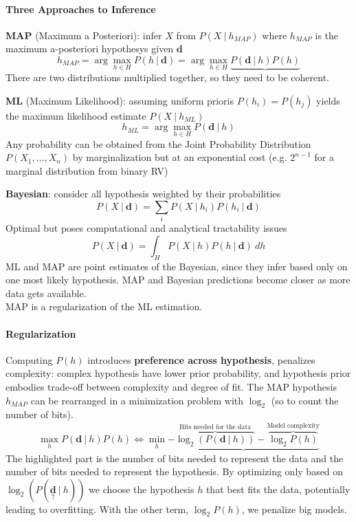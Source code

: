 \documentclass[10pt]{report}
\begin{document}
\paragraph{Three Approaches to Inference}
\begin{list}{}{}
	\item \textbf{MAP} (Maximum a Posteriori): infer $X$ from $P(X\:|\:h_{MAP})$ where $h_{MAP}$ is the maximum a-posteriori hypothesys given $\mathbf{d}$
$$h_{MAP} = \arg\max_{h\in H} P(h\:|\:\mathbf{d}) = \arg\max_{h\in H}\underbrace{ P(\mathbf{d}\:|\:h)P(h)}$$
There are two distributions multiplied together, so they need to be coherent.
	\item \textbf{ML} (Maximum Likelihood): assuming uniform prioris $P(h_i)=P(h_j)$ yields the maximum likelihood estimate $P(X\:|\:h_{ML})$ $$h_{ML} = \arg\max_{h\in H} P(\mathbf{d}\:|\:h)$$
Any probability can be obtained from the Joint Probability Distribution $P(X_1,\ldots,X_n)$ by marginalization but at an exponential cost (e.g. $2^{n-1}$ for a marginal distribution from binary RV)
	\item \textbf{Bayesian}: consider all hypothesis weighted by their probabilities
$$P(X\:|\:\mathbf{d})=\sum_i P(X\:|\:h_i)P(h_i\:|\:\mathbf{d})$$
Optimal but poses computational and analytical tractability issues
$$P(X\:|\:\mathbf{d}) = \int_H P(X\:|\:h)P(h\:|\:\mathbf{d})\:dh$$
	ML and MAP are point estimates of the Bayesian, since they infer based only on one most likely hypothesis. MAP and Bayesian predictions become closer as more data gets available.\\
	MAP is a regularization of the ML estimation.
\end{list}
\paragraph{Regularization} Computing $P(h)$ introduces \textbf{preference across hypothesis}, penalizes complexity: complex hypothesis have lower prior probability, and hypothesis prior embodies trade-off between complexity and degree of fit.
The MAP hypothesis $h_{MAP}$ can be rearranged in a minimization problem with $\log_2$ (so to count the number of bits).
$$\max_h P(\mathbf{d}\:|\:h)P(h)\Leftrightarrow\min_h\underbrace{-\overset{\text{Bits needed for the data}}{\overbrace{\log_2(P(\mathbf{d}\:|\:h))}}-\overset{\text{Model complexity}}{\overbrace{\log_2P(h)}}}$$
The highlighted part is the number of bits needed to represent the data and the number of bits needed to represent the hypothesis. By optimizing only based on $\log_2(P(\underset{\uparrow}{\mathbf{d}}\:|\:h))$ we choose the hypothesis $h$ that best fits the data, potentially leading to overfitting. With the other term, $\log_2P(h)$, we penalize big models.
\end{document}
